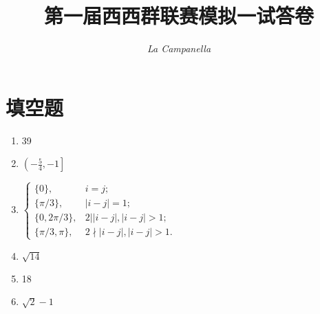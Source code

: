 \documentclass{article}
\title{第一届西西群联赛模拟一试答卷}
\author{\textit{La Campanella}}
\begin{document}
	\maketitle
	\section{填空题}
	\begin{enumerate}[1.]
		\item 39
		\item $\left(-\frac{5}{4},-1\right]$
		\item $\displaystyle 
		\begin{cases}
			\{0\},&i=j;\\
			\{\pi/3\},&|i-j|=1;\\
			\{0,2\pi/3\},&2||i-j|,|i-j|>1;\\
			\{\pi/3,\pi\},&2\nmid|i-j|,|i-j|>1.
		\end{cases}
		$
		\item $\sqrt{14}$
		\item 18
		\item $\sqrt{2}-1$
	\end{enumerate}
\end{document}
